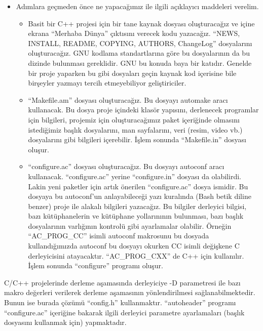 \documentclass[
]{book}
\providecommand{\tightlist}{%
  \setlength{\itemsep}{0pt}\setlength{\parskip}{0pt}}
\begin{document}
\begin{itemize}
\item
  Adımlara geçmeden önce ne yapacağımız ile ilgili açıklayıcı maddeleri verelim.

  \begin{itemize}
  \tightlist
  \item
    Basit bir C++ projesi için bir tane kaynak dosyası oluşturacağız ve içine ekrana ``Merhaba Dünya'' çıktısını verecek kodu yazacağız. ``NEWS, INSTALL, README, COPYING, AUTHORS, ChangeLog'' dosyalarını oluşturacağız. GNU kodlama standartlarına göre bu dosyalarının da bu dizinde bulunması gereklidir. GNU bu konuda baya bir katıdır. Genelde bir proje yaparken bu gibi dosyaları geçin kaynak kod içerisine bile birşeyler yazmayı tercih etmeyebiliyor geliştiriciler.
  \item
    ``Makefile.am'' dosyası oluşturacağız. Bu dosyayı automake aracı kullanacak. Bu dosya proje içindeki klasör yapısını, derlenecek programlar için bilgileri, projemiz için oluşturacağımız paket içeriğinde olmasını istediğimiz başlık dosyalarını, man sayfalarını, veri (resim, video vb.) dosyalarını gibi bilgileri içerebilir. İşlem sonunda ``Makefile.in'' dosyası oluşur.
  \item
    ``configure.ac'' dosyası oluşturacağız. Bu dosyayı autoconf aracı kullanacak. ``configure.ac'' yerine ``configure.in'' dosyası da olabilirdi. Lakin yeni paketler için artık önerilen ``configure.ac'' dosya ismidir. Bu dosyaya bu autoconf'un anlayabileceği yazı kuralında (Bash betik diline benzer) proje ile alakalı bilgileri yazacağız. Bu bilgiler derleyici bilgisi, bazı kütüphanelerin ve kütüphane yollarınının bulunması, bazı başlık dosyalarının varlığının kontrolü gibi ayarlamalar olabilir. Örneğin ``AC\_PROG\_CC'' isimli autoconf makrosunu bu dosyada kullandığımızda autoconf bu dosyayı okurken CC isimli değişkene C derleyicisini atayacaktır. ``AC\_PROG\_CXX'' de C++ için kullanılır. İşlem sonunda ``configure'' programı oluşur.
  \end{itemize}
\end{itemize}

C/C++ projelerinde derleme aşamasında derleyiciye -D parametresi ile bazı makro değerleri verilerek derleme aşamasının yönlendirilmesi sağlanabilmektedir. Bunun ise burada çözümü ``config.h'' kullanmaktır. ``autoheader'' programı ``configure.ac'' içeriğine bakarak ilgili derleyici parametre ayarlamaları (başlık dosyasını kullanmak için) yapmaktadır.
\end{document}

